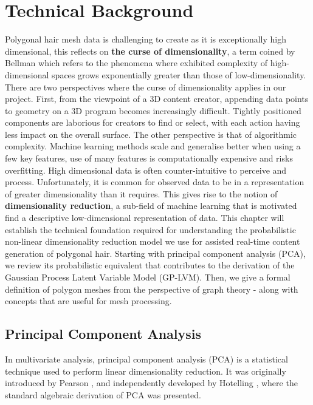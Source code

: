 \documentclass[ %
author={Dillon Keith Diep},
supervisor={Dr. Carl Henrik Ek},
degree={MEng},
title={ART-CG Hair:},
subtitle={Assisted Real-time Content Generation of Stylised Virtual Hair},
type={Research},
year={2017} ]{dissertation}
\begin{document}

\chapter{Technical Background}
\label{chap:technical}
Polygonal hair mesh data is challenging to create as it is exceptionally high dimensional, this reflects on \textbf{the curse of dimensionality}, a term coined by Bellman \cite{curseofdim} which refers to the phenomena where exhibited complexity of high-dimensional spaces grows exponentially greater than those of low-dimensionality. There are two perspectives where the curse of dimensionality applies in our project. First, from the viewpoint of a 3D content creator, appending data points to geometry on a 3D program becomes increasingly difficult. Tightly positioned components are laborious for creators to find or select, with each action having less impact on the overall surface. The other perspective is that of algorithmic complexity. Machine learning methods scale and generalise better when using a few key features, use of many features is computationally expensive and risks overfitting. High dimensional data is often counter-intuitive to perceive and process. Unfortunately, it is common for observed data to be in a representation of greater dimensionality than it requires. This gives rise to the notion of \textbf{dimensionality reduction}, a sub-field of machine learning that is motivated find a descriptive low-dimensional representation of data.
This chapter will establish the technical foundation required for understanding the probabilistic non-linear dimensionality reduction model we use for assisted real-time content generation of polygonal hair. Starting with principal component analysis (PCA), we review its probabilistic equivalent that contributes to the derivation of the Gaussian Process Latent Variable Model (GP-LVM). Then, we give a formal definition of polygon meshes from the perspective of graph theory - along with concepts that are useful for mesh processing.

\section{Principal Component Analysis}
In multivariate analysis, principal component analysis (PCA) is a statistical technique used to perform linear dimensionality reduction. It was originally introduced by Pearson \cite{pca1901}, and independently developed by Hotelling \cite{pca1933}, where the standard algebraic derivation of PCA was presented.
\end{document}
